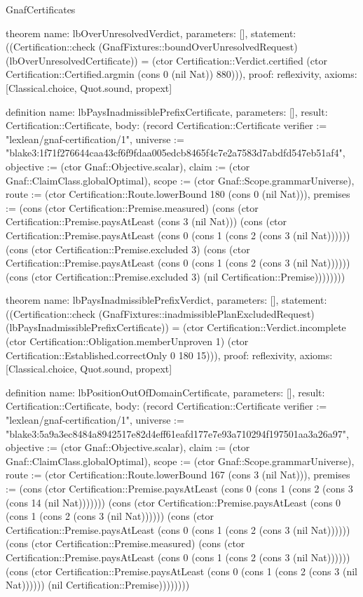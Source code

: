 \begin{lexlean}{GnafCertificates}
\begin{semanticmodule}
theorem{
  name: lbOverUnresolvedVerdict,
  parameters: [],
  statement: ((Certification::check (GnafFixtures::boundOverUnresolvedRequest) (lbOverUnresolvedCertificate)) = (ctor Certification::Verdict.certified (ctor Certification::Certified.argmin (cons 0 (nil Nat)) 880))),
  proof: reflexivity{},
  axioms: [Classical.choice, Quot.sound, propext]
}

definition{
  name: lbPaysInadmissiblePrefixCertificate,
  parameters: [],
  result: Certification::Certificate,
  body: (record Certification::Certificate {verifier := "lexlean/gnaf-certification/1", universe := "blake3:1f71f276644caa43cf6f9fdaa005edcb8465f4c7e2a7583d7abdfd547eb51af4", objective := (ctor Gnaf::Objective.scalar), claim := (ctor Gnaf::ClaimClass.globalOptimal), scope := (ctor Gnaf::Scope.grammarUniverse), route := (ctor Certification::Route.lowerBound 180 (cons 0 (nil Nat))), premises := (cons (ctor Certification::Premise.measured) (cons (ctor Certification::Premise.paysAtLeast (cons 3 (nil Nat))) (cons (ctor Certification::Premise.paysAtLeast (cons 0 (cons 1 (cons 2 (cons 3 (nil Nat)))))) (cons (ctor Certification::Premise.excluded 3) (cons (ctor Certification::Premise.paysAtLeast (cons 0 (cons 1 (cons 2 (cons 3 (nil Nat)))))) (cons (ctor Certification::Premise.excluded 3) (nil Certification::Premise)))))))})
}

theorem{
  name: lbPaysInadmissiblePrefixVerdict,
  parameters: [],
  statement: ((Certification::check (GnafFixtures::inadmissiblePlanExcludedRequest) (lbPaysInadmissiblePrefixCertificate)) = (ctor Certification::Verdict.incomplete (ctor Certification::Obligation.memberUnproven 1) (ctor Certification::Established.correctOnly 0 180 15))),
  proof: reflexivity{},
  axioms: [Classical.choice, Quot.sound, propext]
}

definition{
  name: lbPositionOutOfDomainCertificate,
  parameters: [],
  result: Certification::Certificate,
  body: (record Certification::Certificate {verifier := "lexlean/gnaf-certification/1", universe := "blake3:5a9a3ec8484a8942517e82d4eff61eafd177e7e93a710294f197501aa3a26a97", objective := (ctor Gnaf::Objective.scalar), claim := (ctor Gnaf::ClaimClass.globalOptimal), scope := (ctor Gnaf::Scope.grammarUniverse), route := (ctor Certification::Route.lowerBound 167 (cons 3 (nil Nat))), premises := (cons (ctor Certification::Premise.paysAtLeast (cons 0 (cons 1 (cons 2 (cons 3 (cons 14 (nil Nat))))))) (cons (ctor Certification::Premise.paysAtLeast (cons 0 (cons 1 (cons 2 (cons 3 (nil Nat)))))) (cons (ctor Certification::Premise.paysAtLeast (cons 0 (cons 1 (cons 2 (cons 3 (nil Nat)))))) (cons (ctor Certification::Premise.measured) (cons (ctor Certification::Premise.paysAtLeast (cons 0 (cons 1 (cons 2 (cons 3 (nil Nat)))))) (cons (ctor Certification::Premise.paysAtLeast (cons 0 (cons 1 (cons 2 (cons 3 (nil Nat)))))) (nil Certification::Premise)))))))})
}


\end{semanticmodule}
\end{lexlean}
